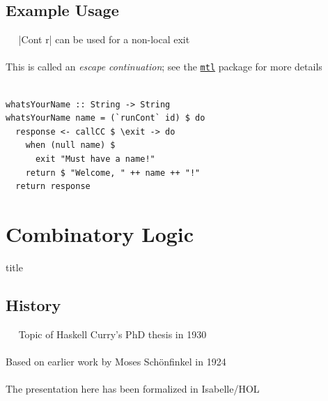 \documentclass{beamer}
\begin{document}
\subsection{Example Usage}
\begin{frame}[fragile]{\insertsectionhead\ \textemdash\
    \insertsubsectionhead}
  |Cont r| can be used for a non-local exit \\~\\

  This is called an \emph{escape continuation}; see the \href{https://hackage.haskell.org/package/mtl-2.2.2/docs/Control-Monad-Cont.html\#g:5}{\texttt{mtl}} package for more details\\~\\

\begin{lstlisting}
whatsYourName :: String -> String
whatsYourName name = (`runCont` id) $ do
  response <- callCC $ \exit -> do
    when (null name) $
      exit "Must have a name!"
    return $ "Welcome, " ++ name ++ "!"
  return response
\end{lstlisting}
\end{frame}

\section{Combinatory Logic}
\begin{frame}[plain]
  \vfill \centering
  \begin{beamercolorbox}[sep=8pt,center,shadow=true,rounded=true]{title}
    \usebeamerfont{title}\insertsectionhead\par%
  \end{beamercolorbox}
  \vfill
\end{frame}

\subsection{History}
\begin{frame}[plain]{\insertsectionhead\ \textemdash\
    \insertsubsectionhead}
Topic of Haskell Curry's PhD thesis in 1930 \cite{curryGrundlagenKombinatorischenLogik1930}\\~\\

Based on earlier work by Moses Sch\"onfinkel in 1924 \cite{schoenfinkelUeberBausteineMathematischen1924}\\~\\

The presentation here has been formalized in Isabelle/HOL
\end{frame}
\end{document}
